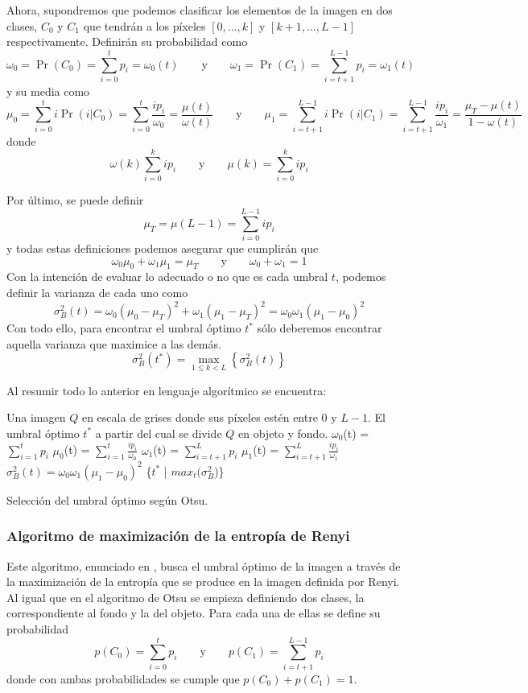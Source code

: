 \documentclass[main]{subfiles}
\begin{document}
Ahora, supondremos que podemos clasificar los elementos de la imagen en dos clases, $C_0$ y $C_1$ que tendrán a los píxeles $[0,\dots,k]$ y $[k+1,\dots,L-1]$ respectivamente. Definirán su probabilidad como
$$\omega_0 = \Pr(C_0) = \sum_{i=0}^{t}p_i=\omega_0(t)\qquad\text{y}\qquad
\omega_1 = \Pr(C_1) = \sum_{i=t+1}^{L-1}p_i=\omega_1(t)$$
y su media como
$$\mu_0=\sum_{i=0}^t i \Pr(i|C_0) = \sum_{i=0}^t \frac{ip_i}{\omega_0} = \frac{\mu(t)}{\omega(t)}\qquad\text{y}\qquad
\mu_1=\sum_{i=t+1}^{L-1} i \Pr(i|C_1) = \sum_{i=t+1}^{L-1} \frac{ip_i}{\omega_1} = \frac{\mu_T-\mu(t)}{1-\omega(t)}$$
donde
$$\omega(k)\sum_{i=0}^k ip_i   \qquad\text{y}\qquad   \mu(k)=\sum_{i=0}^k ip_i$$

Por último, se puede definir
$$\mu_T = \mu(L-1) = \sum_{i=0}^{L-1} ip_i$$
y todas estas definiciones podemos asegurar que cumplirán que
$$\omega_0\mu_0+\omega_1\mu_1 = \mu_T   \qquad\text{y}\qquad   \omega_0+\omega_1 = 1$$
Con la intención de evaluar lo adecuado o no que es cada umbral $t$, podemos definir la varianza de cada uno como
$$\sigma_B^2(t) = \omega_0(\mu_0-\mu_T)^2 + \omega_1(\mu_1-\mu_T)^2 = \omega_0\omega_1(\mu_1-\mu_0)^2$$
Con todo ello, para encontrar el umbral óptimo $t^*$ sólo deberemos encontrar aquella varianza que maximice a las demás.
$$\sigma_B^2(t^*) = \max_{1\leq k <L}\left\{\sigma_B^2(t)\right\}$$

Al resumir todo lo anterior en lenguaje algorítmico se encuentra:

\begin{algorithm}
\begin{algorithmic}[1]
\REQUIRE Una imagen $Q$ en escala de grises donde sus píxeles estén entre $0$ y $L-1$.
\ENSURE El umbral óptimo $t^*$ a partir del cual se divide $Q$ en objeto y fondo.
\STATE $\omega_0$(t) = $\sum_{i=1}^{t}p_i$
\STATE $\mu_0$(t) = $\sum_{i=1}^t \frac{ip_i}{\omega_0}$
\STATE $\omega_1$(t) = $\sum_{i=t+1}^{L}p_i$
\STATE $\mu_1$(t) = $\sum_{i=t+1}^L \frac{ip_i}{\omega_1}$
\STATE $\sigma_B^2(t) = \omega_0\omega_1(\mu_1-\mu_0)^2$
\ENDFOR
\RETURN \{$t^*$ | $max_t(\sigma_B^2$)\}
\end{algorithmic}
\caption{Selección del umbral óptimo según Otsu.}\label{alg:otsu}
\end{algorithm}


\subsubsection{Algoritmo de maximización de la entropía de Renyi}\label{sec:algoritmorenyi}
Este algoritmo, enunciado en \cite{art:sahoo}, busca el umbral óptimo de la imagen a través de la maximización de la entropía que se produce en la imagen definida por Renyi. Al igual que en el algoritmo de Otsu se empieza definiendo dos clases, la correspondiente al fondo y la del objeto. Para cada una de ellas se define su probabilidad
$$p(C_0)=\sum_{i=0}^{t}p_i\qquad\text{y}\qquad p(C_1)=\sum_{i=t+1}^{L-1}p_i$$
donde con ambas probabilidades se cumple que $p(C_0)+p(C_1)=1$.
\end{document}

